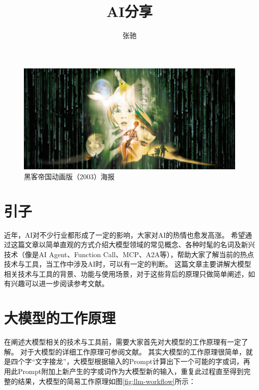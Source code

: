 \documentclass[letterpaper,11pt]{article}
\numberwithin{equation}{section}
\begin{document}
\title{AI分享}
\author{张驰}
\maketitle

\begin{figure}[htbp]
    \centering
    \includegraphics[width=1\textwidth]{../../assets/imgs/ai_share/bg.jpg}
    \caption*{黑客帝国动画版（2003）海报}
\end{figure}

\section{引子}

近年，AI对不少行业都形成了一定的影响，大家对AI的热情也愈发高涨。
希望通过这篇文章以简单直观的方式介绍大模型领域的常见概念、各种时髦的名词及新兴技术（像是AI Agent、Function Call、MCP、A2A等），帮助大家了解当前的热点技术与工具，当工作中涉及AI时，可以有一定的判断。
这篇文章主要讲解大模型相关技术与工具的背景、功能与使用场景，对于这些背后的原理只做简单阐述，如有兴趣可以进一步阅读参考文献。

\section{大模型的工作原理}

在阐述大模型相关的技术与工具前，需要大家首先对大模型的工作原理有一定了解。
对于大模型的详细工作原理可参阅文献\cite{alammar2018transformer}。
其实大模型的工作原理很简单，就是四个字“文字接龙”，大模型根据输入的Prompt计算出下一个可能的字或词，再用此Prompt附加上新产生的字或词作为大模型新的输入，重复此过程直至得到完整的结果，大模型的简易工作原理如图\ref{fig:llm-workflow}所示：
\end{document}
